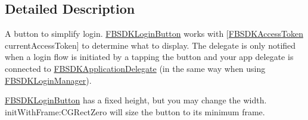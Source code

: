 \subsection{Detailed Description}
A button to simplify login.  {\ttfamily \hyperlink{interface_f_b_s_d_k_login_button}{F\-B\-S\-D\-K\-Login\-Button}} works with {\ttfamily \mbox{[}\hyperlink{interface_f_b_s_d_k_access_token}{F\-B\-S\-D\-K\-Access\-Token} current\-Access\-Token\mbox{]}} to determine what to display. The delegate is only notified when a login flow is initiated by a tapping the button and your app delegate is connected to {\ttfamily \hyperlink{interface_f_b_s_d_k_application_delegate}{F\-B\-S\-D\-K\-Application\-Delegate}} (in the same way when using {\ttfamily \hyperlink{interface_f_b_s_d_k_login_manager}{F\-B\-S\-D\-K\-Login\-Manager}}).

{\ttfamily \hyperlink{interface_f_b_s_d_k_login_button}{F\-B\-S\-D\-K\-Login\-Button}} has a fixed height, but you may change the width. {\ttfamily init\-With\-Frame\-:C\-G\-Rect\-Zero} will size the button to its minimum frame. 

